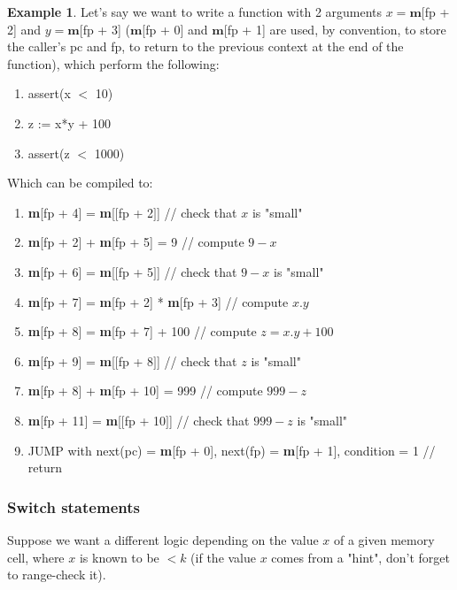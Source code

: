 \documentclass{article}
\theoremstyle{definition}
\newtheorem{exmp}{Example}[section]
\begin{document}
\begin{exmp}
	Let's say we want to write a function with 2 arguments $x = \textbf{m}$[fp + 2] and $y = \textbf{m}$[fp + 3] ($\textbf{m}$[fp + 0] and $\textbf{m}$[fp + 1] are used, by convention, to store the caller's pc and fp, to return to the previous context at the end of the function), which perform the following:
	
	\begin{enumerate}
		\item assert(x $<$ 10)
		\item z := x*y + 100
		\item assert(z $<$ 1000)
	\end{enumerate}
	
	Which can be compiled to:
	
	\begin{enumerate}
		\item \textbf{m}[fp + 4] = \textbf{m}[$\big[$fp + 2$\big]$] // check that $x$ is "small"
		\item \textbf{m}[fp + 2] + \textbf{m}[fp + 5] = 9 // compute $9 - x$
		\item \textbf{m}[fp + 6] = \textbf{m}[$\big[$fp + 5$\big]$] // check that $9 - x$ is "small"
		\item \textbf{m}[fp + 7] = \textbf{m}[fp + 2] * \textbf{m}[fp + 3] // compute $x.y$
		\item \textbf{m}[fp + 8] = \textbf{m}[fp + 7] + 100 // compute $z = x.y + 100$
		\item \textbf{m}[fp + 9] = \textbf{m}[$\big[$fp + 8$\big]$] // check that $z$ is "small"
		\item \textbf{m}[fp + 8] + \textbf{m}[fp + 10] = 999 // compute $999 - z$
		\item \textbf{m}[fp + 11] = \textbf{m}[$\big[$fp + 10$\big]$] // check that $999 - z$ is "small"
		\item JUMP with next(pc) = \textbf{m}[fp + 0], next(fp) = \textbf{m}[fp + 1], condition = 1 // return
	\end{enumerate}
	
	 
\end{exmp}


\subsubsection{Switch statements}

Suppose we want a different logic depending on the value $x$ of a given memory cell, where $x$ is known to be $< k$ (if the value $x$ comes from a "hint", don't forget to range-check it).
\end{document}
